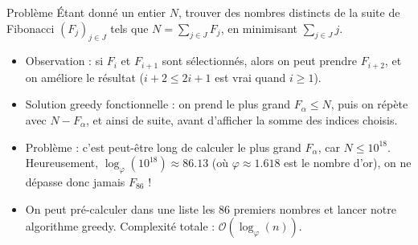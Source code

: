 \begin{frame}
    \frametitle{\problemtitle}
    \begin{block}{Problème}
        Étant donné un entier $N$, trouver des nombres distincts de la suite de Fibonacci $(F_{j})_{j \in J}$ tels que $N = \sum_{j \in J} F_{j}$, en minimisant $\sum_{j \in J} j$.
    \end{block}
    \pause
    \begin{itemize}[<+->]
        \item Observation : si $F_i$ et $F_{i+1}$ sont sélectionnés, alors on peut prendre $F_{i+2}$, et on améliore le résultat ($i+2 \leq 2i+1$ est vrai quand $i \geq 1$).
        \item Solution greedy fonctionnelle : on prend le plus grand $F_\alpha \leq N$, puis on répète avec $N - F_{\alpha}$, et ainsi de suite, avant d'afficher la somme des indices choisis.
        \item Problème : c'est peut-être long de calculer le plus grand $F_\alpha$, car $N \leq 10^{18}$. Heureusement, $\log_{\varphi}(10^{18}) \approx 86.13$ (où $\varphi \approx 1.618$ est le nombre d'or), on ne dépasse donc jamais $F_{86}$ !
        \item On peut pré-calculer dans une liste les $86$ premiers nombres et lancer notre algorithme greedy. Complexité totale : $\mathcal{O}(\log_{\varphi}(n))$.
    \end{itemize}

\end{frame}